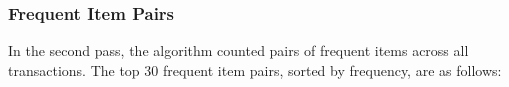 \begin{table}[h]
    \centering
    \caption{Most Frequent Items with Their Counts}
    \setlength{\tabcolsep}{2pt} %
    \renewcommand{\arraystretch}{1} %
    \label{tab:frequent_items}
\end{table}

\subsubsection{Frequent Item Pairs}
In the second pass, the algorithm counted pairs of frequent items across all transactions.
The top 30 frequent item pairs, sorted by frequency, are as follows:

